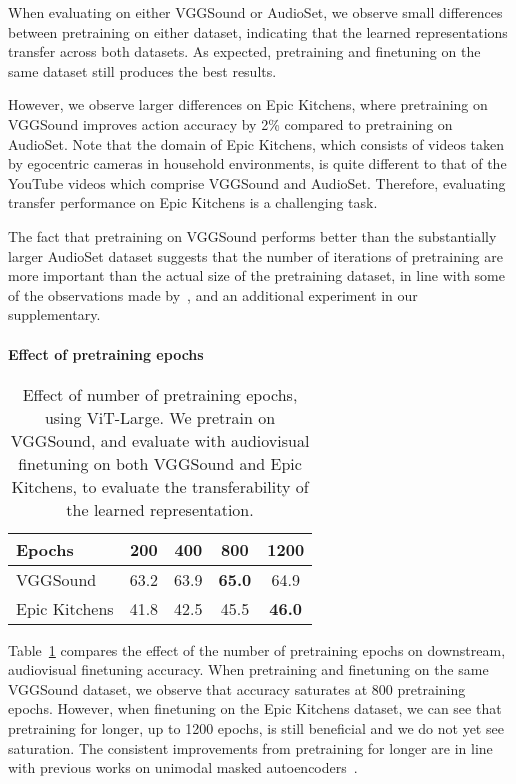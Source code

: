 \documentclass[10pt,twocolumn,letterpaper]{article}
\def \paravspace {-1\baselineskip}
\begin{document}
 
When evaluating on either VGGSound or AudioSet, we observe small differences between pretraining on either dataset, indicating that the learned representations transfer across both datasets.
As expected, pretraining and finetuning on the same dataset still produces the best results.

However, we observe larger differences on Epic Kitchens, where pretraining on VGGSound improves action accuracy by 2\% compared to pretraining on AudioSet.
Note that the domain of Epic Kitchens, which consists of videos taken by egocentric cameras in household environments, is quite different to that of the YouTube videos which comprise VGGSound and AudioSet.
Therefore, evaluating transfer performance on Epic Kitchens is a challenging task.

The fact that pretraining on VGGSound performs better than the substantially larger AudioSet dataset suggests that the number of iterations of pretraining are more important than the actual size of the pretraining dataset, in line with some of the observations made by~\cite{tong2022videomae}, and an additional experiment in our supplementary.



\vspace{\paravspace}
\paragraph{Effect of pretraining epochs}
\begin{table}[t]
	\caption{
		Effect of number of pretraining epochs, using ViT-Large.
		We pretrain on VGGSound, and evaluate with audiovisual finetuning on both VGGSound and Epic Kitchens, to evaluate the transferability of the learned representation.
	}
	\vspace{-0.5\baselineskip}
	\centering
	\begin{tabular}{lcccc}
	\toprule
		Epochs           &   200    &  400   & 800              & 1200\\ \midrule 
		VGGSound         &   63.2   &  63.9  & \textbf{65.0}    &      64.9  \\
		Epic Kitchens 	 &  41.8    &  42.5  & 45.5             &  \textbf{46.0} \\
	\bottomrule
	\end{tabular}
	\label{tab:ablation_epochs_effect}
	\vspace{-\baselineskip}
\end{table}

 
Table~\ref{tab:ablation_epochs_effect} compares the effect of the number of pretraining epochs on downstream, audiovisual finetuning accuracy.
When pretraining and finetuning on the same VGGSound dataset, we observe that accuracy saturates at 800 pretraining epochs.
However, when finetuning on the Epic Kitchens dataset, we can see that pretraining for longer, up to 1200 epochs, is still beneficial and we do not yet see saturation.
The consistent improvements from pretraining for longer are in line with previous works on unimodal masked autoencoders~\cite{he2022masked,tong2022videomae,feichtenhofer2022masked}.
\end{document}
